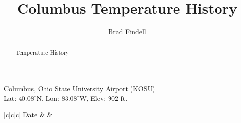 \documentclass[nooutcomes]{ximera}
\title{Columbus Temperature History}
\author{Brad Findell}
\begin{document}
\begin{abstract}
Temperature History
\end{abstract}
\maketitle





Columbus, Ohio State University Airport (KOSU)\\
\small{Lat: $40.08^\circ$N, Lon: $83.08^\circ$W, Elev: $902$ ft.}

\begin{tabular}{|c|c|c|}
\hline
Date  &     
      &    \\ \hline

\end{tabular}
\end{document}
